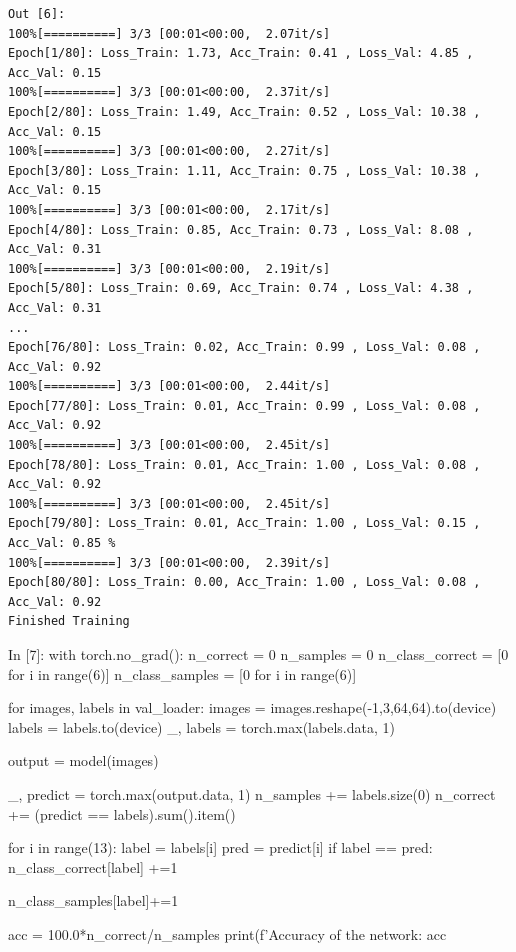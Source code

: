 \documentclass[12pt, a4paper]{article}
\begin{document}
\newpage
\begin{verbatim}
Out [6]:
100%[==========] 3/3 [00:01<00:00,  2.07it/s]
Epoch[1/80]: Loss_Train: 1.73, Acc_Train: 0.41 , Loss_Val: 4.85 , Acc_Val: 0.15 
100%[==========] 3/3 [00:01<00:00,  2.37it/s]
Epoch[2/80]: Loss_Train: 1.49, Acc_Train: 0.52 , Loss_Val: 10.38 , Acc_Val: 0.15
100%[==========] 3/3 [00:01<00:00,  2.27it/s]
Epoch[3/80]: Loss_Train: 1.11, Acc_Train: 0.75 , Loss_Val: 10.38 , Acc_Val: 0.15 
100%[==========] 3/3 [00:01<00:00,  2.17it/s]
Epoch[4/80]: Loss_Train: 0.85, Acc_Train: 0.73 , Loss_Val: 8.08 , Acc_Val: 0.31 
100%[==========] 3/3 [00:01<00:00,  2.19it/s]
Epoch[5/80]: Loss_Train: 0.69, Acc_Train: 0.74 , Loss_Val: 4.38 , Acc_Val: 0.31 
...
Epoch[76/80]: Loss_Train: 0.02, Acc_Train: 0.99 , Loss_Val: 0.08 , Acc_Val: 0.92 
100%[==========] 3/3 [00:01<00:00,  2.44it/s]
Epoch[77/80]: Loss_Train: 0.01, Acc_Train: 0.99 , Loss_Val: 0.08 , Acc_Val: 0.92 
100%[==========] 3/3 [00:01<00:00,  2.45it/s]
Epoch[78/80]: Loss_Train: 0.01, Acc_Train: 1.00 , Loss_Val: 0.08 , Acc_Val: 0.92 
100%[==========] 3/3 [00:01<00:00,  2.45it/s]
Epoch[79/80]: Loss_Train: 0.01, Acc_Train: 1.00 , Loss_Val: 0.15 , Acc_Val: 0.85 %
100%[==========] 3/3 [00:01<00:00,  2.39it/s]
Epoch[80/80]: Loss_Train: 0.00, Acc_Train: 1.00 , Loss_Val: 0.08 , Acc_Val: 0.92 
Finished Training
\end{verbatim}

\begin{python}
In [7]: with torch.no_grad():
            n_correct = 0
            n_samples = 0
            n_class_correct = [0 for i in range(6)]
            n_class_samples = [0 for i in range(6)]
            
            for images, labels in val_loader:
                images = images.reshape(-1,3,64,64).to(device)
                labels = labels.to(device)
                _, labels = torch.max(labels.data, 1)
        
                output = model(images)
                
                _, predict = torch.max(output.data, 1)
                n_samples += labels.size(0)
                n_correct += (predict == labels).sum().item()
                
                for i in range(13):
                    label = labels[i]
                    pred = predict[i]
                    if label == pred:
                        n_class_correct[label] +=1
                        
                    n_class_samples[label]+=1
                    
            acc = 100.0*n_correct/n_samples
            print(f'Accuracy of the network: {acc} %
\end{python}
\end{document}
